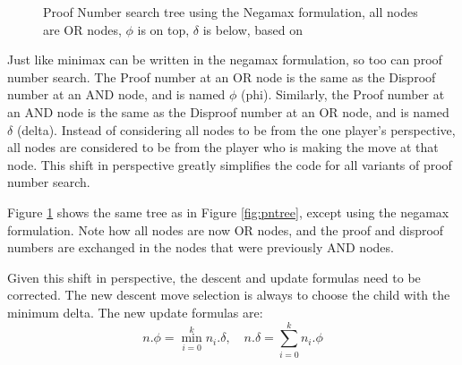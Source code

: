\begin{figure}
\centering
{}
\caption{Proof Number search tree using the Negamax formulation, all nodes are OR nodes, $\phi$ is on top, $\delta$ is below, based on \cite{winands2003-PDS-PN}}
\label{fig:negamaxtree}
\end{figure}

Just like minimax can be written in the negamax formulation, so too can proof number search. The Proof number at an OR node is the same as the Disproof number at an AND node, and is named $\phi$ (phi). Similarly, the Proof number at an AND node is the same as the Disproof number at an OR node, and is named $\delta$ (delta). Instead of considering all nodes to be from the one player's perspective, all nodes are considered to be from the player who is making the move at that node. This shift in perspective greatly simplifies the code for all variants of proof number search.

Figure \ref{fig:negamaxtree} shows the same tree as in Figure \ref{fig:pntree}, except using the negamax formulation. Note how all nodes are now OR nodes, and the proof and disproof numbers are exchanged in the nodes that were previously AND nodes.

Given this shift in perspective, the descent and update formulas need to be corrected. The new descent move selection is always to choose the child with the minimum delta. The new update formulas are: $$ n.\phi = \displaystyle\min\limits_{i=0}^k n_i.\delta, \quad n.\delta = \displaystyle\sum\limits_{i=0}^k n_i.\phi $$

